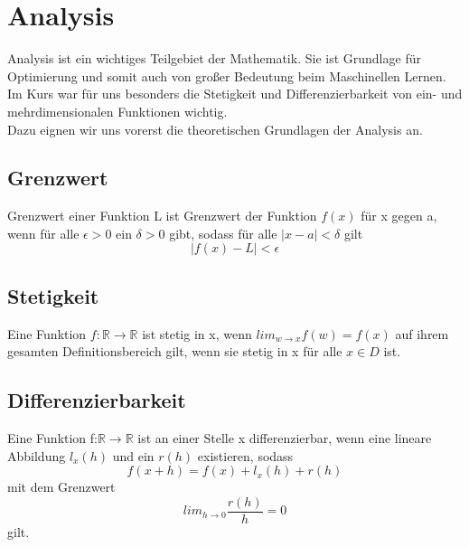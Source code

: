 \section{Analysis}
  

Analysis ist ein wichtiges Teilgebiet der Mathematik. Sie ist Grundlage für Optimierung und somit auch von großer Bedeutung beim Maschinellen Lernen. \\
Im Kurs war für uns besonders die Stetigkeit und Differenzierbarkeit von ein- und mehrdimensionalen Funktionen wichtig. \\
Dazu eignen wir uns vorerst die theoretischen Grundlagen der Analysis an. \\

\subsection{Grenzwert}
Grenzwert einer Funktion L ist Grenzwert der Funktion $f(x)$ für x gegen a, wenn für alle $\epsilon > 0$ ein $\delta > 0$ gibt, sodass für alle $|x-a| < \delta$ gilt \begin{equation*}|f(x)-L|<\epsilon\end{equation*}

\subsection{Stetigkeit}
Eine Funktion $f:\mathds{R}\rightarrow \mathds{R}$ ist stetig in x, wenn $lim_{w\rightarrow x}f(w)=f(x)$ auf ihrem gesamten Definitionsbereich gilt, wenn sie stetig in x für alle $x\in D$ ist.

\subsection{Differenzierbarkeit}
Eine Funktion f:$\mathds{R}\rightarrow\mathds{R}$ ist an einer Stelle x differenzierbar, wenn eine lineare Abbildung $ l_ x (h)$ und ein $r(h)$ existieren, sodass \begin{equation*}f(x+h)=f(x)+l_{x}(h)+r(h)\end{equation*} mit dem Grenzwert \begin{equation*}lim_{h\rightarrow 0} \frac{r(h)}{h}= 0\end{equation*}gilt.

